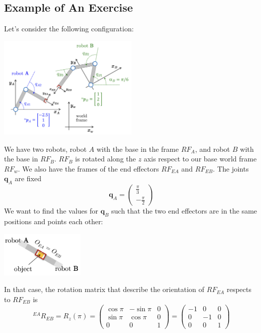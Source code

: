 \documentclass[10pt, letterpaper]{report}
\begin{document}
\subsection{Example of An Exercise}
Let's consider the following configuration:\begin{center}
    \includegraphics[width=0.5\textwidth ]{images/exercise1.png}
\end{center}
We have two robots, robot $A$ with the base in the frame $RF_A$, and robot $B$ with the base in $RF_B$. $RF_B$ is rotated along the $z$ axis respect to our base world frame $RF_w$. We also have the frames of the end effectors $RF_{EA}$ and $RF_{EB}$. The joints $\mathbf q_A$ are fixed\begin{equation}
    \mathbf q_A=\begin{pmatrix}
        \frac{\pi}{3}\\-\frac{\pi}{2}
    \end{pmatrix}
\end{equation}
We want to find the values for $\mathbf q_B$ such that 
the two end effectors are in the same positions and points each other:\begin{center}
    \includegraphics[width=0.3\textwidth ]{images/exercise11.png}
\end{center} 
In that case, the rotation matrix that describe the orientation of $RF_{EA}$ respects to $RF_{EB}$ is\begin{equation}
    {}^{EA}R_{EB}=R_z(\pi)=\begin{pmatrix}
        \cos\pi & -\sin\pi &0\\
        \sin\pi&\cos\pi&0\\
        0&0&1
    \end{pmatrix} = \begin{pmatrix}
        -1 & 0 &0\\
        0&-1&0\\
        0&0&1
    \end{pmatrix}
\end{equation}
\end{document}
